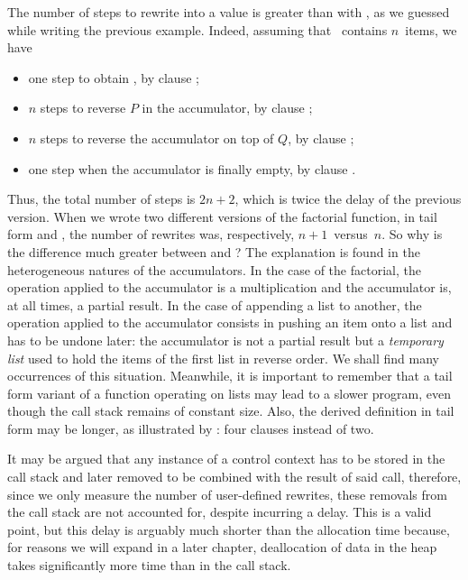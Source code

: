 The number of steps to rewrite  into a
value is greater than with , as we guessed
while writing the previous example. Indeed, assuming that
~contains \(n\)~items, we have
\begin{itemize} 

  \item one step to obtain , by clause
    \clause{\alpha};

  \item \(n\) steps to reverse \(P\) in the accumulator, by clause
    \clause{\delta};

  \item \(n\) steps to reverse the accumulator on top of \(Q\), by
    clause \clause{\gamma};

  \item one step when the accumulator is finally empty, by clause
    \clause{\beta}.

\end{itemize}
Thus, the total number of steps is \(2n+2\), which is twice the delay
of the previous version. When we wrote two different versions of the
factorial function,  in tail form and
, the number of rewrites was, respectively,
\(n+1\)~versus~\(n\). So why is the difference much greater between
 and ?  The explanation is found
in the heterogeneous natures of the accumulators. In the case of the
factorial, the operation applied to the accumulator is a
multiplication and the accumulator is, at all times, a partial
result. In the case of appending a list to another, the operation
applied to the accumulator consists in pushing an item onto a list and
has to be undone later: the accumulator is not a partial result but a
\emph{temporary list} used to hold the items of the first list in
reverse order. We shall find many occurrences of this
situation. Meanwhile, it is important to remember that a tail form
variant of a function operating on lists may lead to a slower program,
even though the call stack remains of constant size. Also, the derived
definition in tail form may be longer, as illustrated by
: four clauses instead of two.

It may be argued that any instance of a control context has to be
stored in the call stack and later removed to be combined with the
result of said call, therefore, since we only measure the number of
user\hyp{}defined rewrites, these removals from the call stack are not
accounted for, despite incurring a delay. This is a valid point, but
this delay is arguably much shorter than the allocation time because,
for reasons we will expand in a later chapter, deallocation of data in
the heap takes significantly more time than in the call stack.

